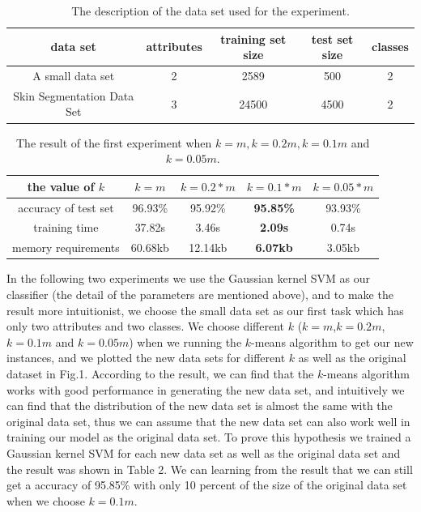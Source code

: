 \documentclass[runningheads,a4paper]{llncs}
\begin{document}
\begin{table}[tbp]
\centering  
\begin{tabular}{c|c|c|c|c}
\hline
		data set &attributes &training set size &test set size &classes\\ 
\hline  
		A small data set &2 &2589 &500 &2\\        
		Skin Segmentation Data Set &3 &24500 &4500 &2\\       
\hline
\end{tabular}
\caption{The description of the data set used for the experiment.}
\end{table}

\begin{table}[tbp]
\centering  
\begin{tabular}{c|c|c|c|c}
\hline
		the value of $k$ &$k=m$ &$k=0.2*m$ &$k=0.1*m$ &$k=0.05*m$\\ 
\hline  
		accuracy of test set &96.93\% &95.92\% &\textbf{95.85\%} &93.93\%\\  
		
		training time & 37.82s &3.46s &\textbf{2.09s} & 0.74s \\
		
		memory requirements  & 60.68kb & 12.14kb & \textbf{6.07kb} & 3.05kb \\     
\hline
\end{tabular}
\caption{The result of the first experiment when $k=m, k=0.2m, k=0.1m$ and $k=0.05m$.}
\end{table}

		In the following two experiments we use the Gaussian kernel SVM as our classifier (the detail of 
		the parameters are mentioned above), and to make the 
		result more intuitionist, we choose the small data set as our first task which has only two 
		attributes and two classes. We choose different $k$ ($k=m$,$k=0.2m$, $k=0.1m$ and $k=0.05m$) when we 
		running the $k$-means algorithm to get our new instances, and we plotted the new data sets for 
		different $k$ as well 
		as the original dataset in Fig.1. According to the result, we can find that the $k$-means algorithm 
		works with good performance in generating the new data set, and intuitively we can find that
		the distribution of 
		the new data set is almost the same with the original data set, thus we can assume that the new data 
		set can also work well in 
		training our model as the original data set. To prove this hypothesis we trained 
		a Gaussian kernel SVM for each new data set as well as the original data set and the result was shown in 
		Table 2. We can learning from the result that we can still get a accuracy of 95.85\% with only 10 percent of 
		the size of the original data set when we choose $k=0.1m$.
		
\end{document}
